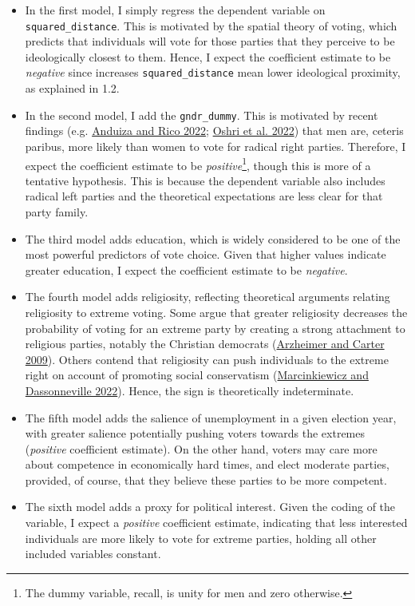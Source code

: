 \documentclass[
]{article}
\begin{document}
\begin{itemize}
\item
  In the first model, I simply regress the dependent variable on
  \texttt{squared\_distance}. This is motivated by the spatial theory of
  voting, which predicts that individuals will vote for those parties
  that they perceive to be ideologically closest to them. Hence, I
  expect the coefficient estimate to be \emph{negative} since increases
  \texttt{squared\_distance} mean lower ideological proximity, as
  explained in 1.2.
\item
  In the second model, I add the \texttt{gndr\_dummy}. This is motivated
  by recent findings (e.g.
  \protect\hyperlink{ref-anduiza2022sexism}{Anduiza and Rico 2022};
  \protect\hyperlink{ref-oshri2022risk}{Oshri et al. 2022}) that men
  are, ceteris paribus, more likely than women to vote for radical right
  parties. Therefore, I expect the coefficient estimate to be
  \emph{positive}\footnote{The dummy variable, recall, is unity for men
    and zero otherwise.}, though this is more of a tentative hypothesis.
  This is because the dependent variable also includes radical left
  parties and the theoretical expectations are less clear for that party
  family.
\item
  The third model adds education, which is widely considered to be one
  of the most powerful predictors of vote choice. Given that higher
  values indicate greater education, I expect the coefficient estimate
  to be \emph{negative}.
\item
  The fourth model adds religiosity, reflecting theoretical arguments
  relating religiosity to extreme voting. Some argue that greater
  religiosity decreases the probability of voting for an extreme party
  by creating a strong attachment to religious parties, notably the
  Christian democrats
  (\protect\hyperlink{ref-arzheimer2009christian}{Arzheimer and Carter
  2009}). Others contend that religiosity can push individuals to the
  extreme right on account of promoting social conservatism
  (\protect\hyperlink{ref-marcinkiewicz2022religious}{Marcinkiewicz and
  Dassonneville 2022}). Hence, the sign is theoretically indeterminate.
\item
  The fifth model adds the salience of unemployment in a given election
  year, with greater salience potentially pushing voters towards the
  extremes (\emph{positive} coefficient estimate). On the other hand,
  voters may care more about competence in economically hard times, and
  elect moderate parties, provided, of course, that they believe these
  parties to be more competent.
\item
  The sixth model adds a proxy for political interest. Given the coding
  of the variable, I expect a \emph{positive} coefficient estimate,
  indicating that less interested individuals are more likely to vote
  for extreme parties, holding all other included variables constant.
\end{itemize}
\end{document}
